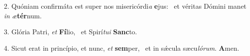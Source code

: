2. Quóniam confirmáta est super nos misericórdi\textit{a} \textbf{e}jus: \ast\  et véritas Dómini manet \textit{in} \textit{æ}\textbf{tér}num.\

3. Glória Patri, \textit{et} \textbf{Fí}lio, \ast\  et Spirí\textit{tu}\textit{i} \textbf{Sanc}to.\

4. Sicut erat in princípio, et nunc, \textit{et} \textbf{sem}per, \ast\  et in sǽcula sæcu\textit{ló}\textit{rum}. \textbf{A}men.\

